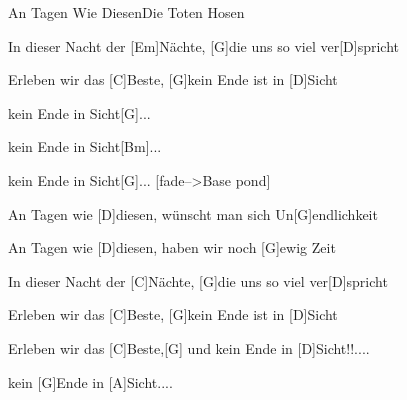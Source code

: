 \begin{song}{An Tagen Wie Diesen}{Die Toten Hosen}
\begin{chorus}
In dieser Nacht der [Em]Nächte, [G]die uns so viel ver[D]spricht

Erleben wir das [C]Beste, [G]kein Ende ist in [D]Sicht

kein Ende in Sicht[G]...

kein Ende in Sicht[Bm]...

kein Ende in Sicht[G]...   [fade-->Base pond]

An Tagen wie [D]diesen, wünscht man sich Un[G]endlichkeit

An Tagen wie [D]diesen, haben wir noch [G]ewig Zeit

In dieser Nacht der [C]Nächte, [G]die uns so viel ver[D]spricht

Erleben wir das [C]Beste, [G]kein Ende ist in [D]Sicht

Erleben wir das [C]Beste,[G] und kein Ende in [D]Sicht!!....

kein [G]Ende in [A]Sicht....
\end{chorus}
\begin{outro}
[D]
\end{outro}
\end{song}
